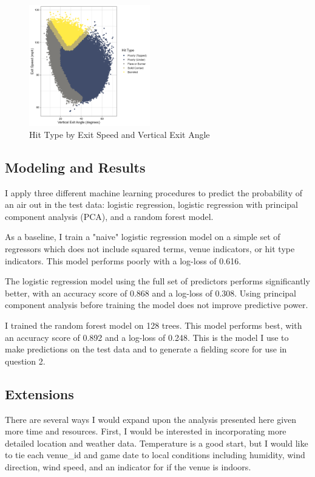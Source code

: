 \begin{figure}[htb]
  \includegraphics[width = 0.47\textwidth]{../../output/figs/barreled.png}
  \caption{Hit Type by Exit Speed and Vertical Exit Angle}
  \label{fig:barreled}
\end{figure}

\subsection{Modeling and Results}
\label{subsec:model}

I apply three different machine learning procedures to predict the probability of an air out in the test data: logistic regression, logistic regression with principal component analysis (PCA), and a random forest model.

As a baseline, I train a "naive" logistic regression model on a simple set of regressors which does not include squared terms, venue indicators, or hit type indicators. This model performs poorly with a log-loss of 0.616.

The logistic regression model using the full set of predictors performs significantly better, with an accuracy score of 0.868 and a log-loss of 0.308. Using principal component analysis before training the model does not improve predictive power.

I trained the random forest model on 128 trees. This model performs best, with an accuracy score of 0.892 and a log-loss of 0.248. This is the model I use to make predictions on the test data and to generate a fielding score for use in question 2.

\subsection{Extensions}
\label{subsec:results}

There are several ways I would expand upon the analysis presented here given more time and resources. First, I would be interested in incorporating more detailed location and weather data. Temperature is a good start, but I would like to tie each venue\_id and game date to local conditions including humidity, wind direction, wind speed, and an indicator for if the venue is indoors.


